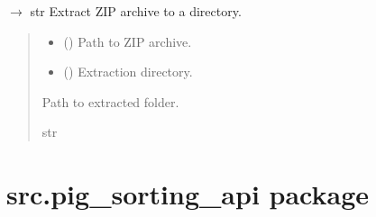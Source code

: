 \documentclass[letterpaper,10pt,english]{sphinxmanual}
\begin{document}
\begin{fulllineitems}
\label{\detokenize{modules/src.model_training.trainer:src.model_training.trainer.unzip_file}}
\pysigstartsignatures
\pysiglinewithargsret
{}
{\sphinxparamcomma {}}
{{ $\rightarrow$ str}}
\pysigstopsignatures
\sphinxAtStartPar
Extract ZIP archive to a directory.
\begin{quote}\begin{description}
\begin{itemize}
\item {} 
\sphinxAtStartPar
{} () \textendash{} Path to ZIP archive.

\item {} 
\sphinxAtStartPar
{} (\sphinxstyleliteralemphasis{\sphinxupquote{, }}) \textendash{} Extraction directory.

\end{itemize}

\sphinxAtStartPar
Path to extracted folder.

\sphinxAtStartPar
str

\end{description}\end{quote}

\end{fulllineitems}


\sphinxstepscope


\section{src.pig\_sorting\_api package}
\label{\detokenize{modules/src.pig_sorting_api:module-src.pig_sorting_api}}\label{\detokenize{modules/src.pig_sorting_api:src-pig-sorting-api-package}}\label{\detokenize{modules/src.pig_sorting_api::doc}}
\end{document}
